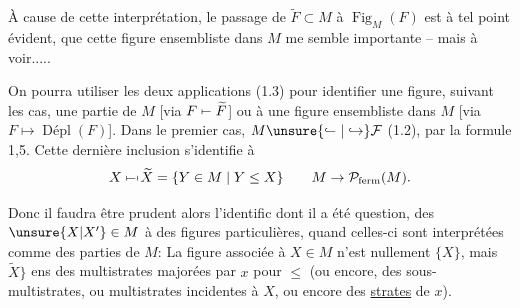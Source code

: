 À cause de cette interprétation, le passage de $\widetilde F\subset M$ à $\operatorname{Fig}_{M}(F)$ est à tel point évident, que  cette figure ensembliste dans $M$ me semble  importante -- mais à voir.....


On pourra utiliser les deux applications (1.3) pour identifier une figure, suivant les cas,  une partie de $M$ [via $F\mapstochar\relbar\widetilde F$] ou à une figure ensembliste dans $M$ [via $F\mapsto\operatorname{\text{Dépl}}(F)$]. Dans le premier cas,   $M\unsure{\lhook\joinrel\relbar|\hookrightarrow}\mathcal{F}$ (1.2)\deleted{\unsure{(}}, par la formule 1,5. Cette dernière inclusion s'identifie à
\[
X\mathrel{\mapstochar\relbar\mapstochar}\widetilde X=\{Y\in M\mid Y\leq X\}
\qquad M\to\mathcal{P}_{\mathrm{ferm}}(M).
\]

Donc il faudra être prudent alors  l'identific dont il a été question, des $\unsure{X|X'}\in M$   à des figures particulières, quand celles-ci sont interprétées comme des parties de $M$: La figure associée à $X\in M$ n'est nullement $\{X\}$, mais $\widetilde X\rbrace$  ens des multistrates majorées par $x$ pour $\leq$ (ou encore, des sous-multistrates, ou multistrates incidentes à $X$, ou encore des  \uline{strates} de $x$).
